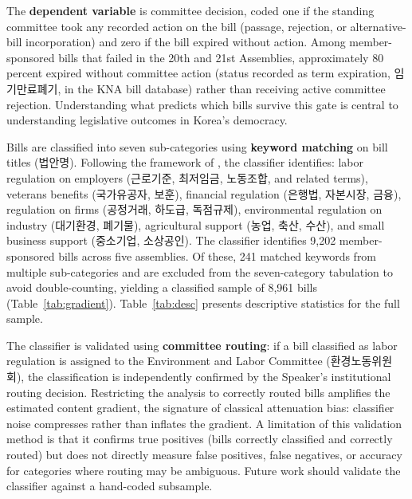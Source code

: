 \documentclass[11pt]{article}
\begin{document}
The \textbf{dependent variable} is committee decision, coded one if the standing committee took any recorded action on the bill (passage, rejection, or alternative-bill incorporation) and zero if the bill expired without action. Among member-sponsored bills that failed in the 20th and 21st Assemblies, approximately 80 percent expired without committee action (status recorded as term expiration, 임기만료폐기, in the KNA bill database) rather than receiving active committee rejection. Understanding what predicts which bills survive this gate is central to understanding legislative outcomes in Korea's democracy.

Bills are classified into seven sub-categories using \textbf{keyword matching} on bill titles (법안명). Following the framework of \citet{wilson1980}, the classifier identifies: labor regulation on employers (근로기준, 최저임금, 노동조합, and related terms), veterans benefits (국가유공자, 보훈), financial regulation (은행법, 자본시장, 금융), regulation on firms (공정거래, 하도급, 독점규제), environmental regulation on industry (대기환경, 폐기물), agricultural support (농업, 축산, 수산), and small business support (중소기업, 소상공인). The classifier identifies 9,202 member-sponsored bills across five assemblies. Of these, 241 matched keywords from multiple sub-categories and are excluded from the seven-category tabulation to avoid double-counting, yielding a classified sample of 8,961 bills (Table~\ref{tab:gradient}). Table~\ref{tab:desc} presents descriptive statistics for the full sample.

The classifier is validated using \textbf{committee routing}: if a bill classified as labor regulation is assigned to the Environment and Labor Committee (환경노동위원회), the classification is independently confirmed by the Speaker's institutional routing decision. Restricting the analysis to correctly routed bills amplifies the estimated content gradient, the signature of classical attenuation bias: classifier noise compresses rather than inflates the gradient. A limitation of this validation method is that it confirms true positives (bills correctly classified and correctly routed) but does not directly measure false positives, false negatives, or accuracy for categories where routing may be ambiguous. Future work should validate the classifier against a hand-coded subsample.
\end{document}
